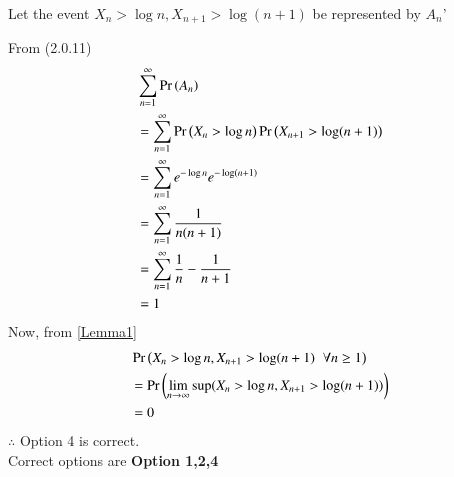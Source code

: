 \documentclass[journal,12pt,twocolumn]{IEEEtran}
\begin{document}
\begin{enumerate}
    Let the event $X_n > \log n,X_{n+1}>\log (n+1)$ be represented by $A_n$'
    
    From (2.0.11)
    \begin{align}
        &\sum_{n=1}^{\infty}\Pr\left(A_n\right)\\
        &= \sum_{n=1}^{\infty}\Pr\left(X_n>\log n\right)\Pr\left(X_{n+1}>\log (n+1)\right)\\
        &=\sum_{n=1}^{\infty}e^{-\log n}e^{-\log (n+1)}\\
        &=\sum_{n=1}^{\infty}\frac{1}{n(n+1)}\\
        &=\sum_{n=1}^{\infty}\frac{1}{n}-\frac{1}{n+1}\\
        &=1
    \end{align}
    Now, from \eqref{Lemma1}
    \begin{align}
        &\Pr\left(X_n>\log n,X_{n+1}>\log (n+1)\hspace{0.2cm}\forall n\geq1\right)\\
        &=\Pr\left(\lim_{n \rightarrow \infty}\sup ( X_n>\log n,X_{n+1}>\log (n+1))\right)\\
        &=0
    \end{align}
    $\therefore$ Option 4 is correct.\\
    Correct options are \textbf{Option 1,2,4}
\end{enumerate}
\end{document}
